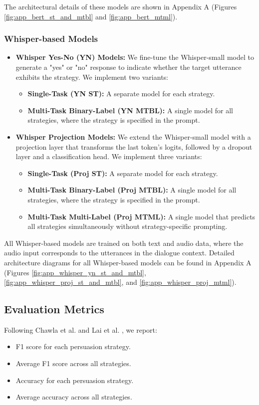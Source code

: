 \documentclass{article}
\begin{document}
The architectural details of these models are shown in Appendix A (Figures \ref{fig:app_bert_st_and_mtbl} and \ref{fig:app_bert_mtml}).

\subsubsection{Whisper-based Models}
\begin{itemize}
    \item \textbf{Whisper Yes-No (YN) Models:} We fine-tune the Whisper-small model to generate a "yes" or "no" response to indicate whether the target utterance exhibits the strategy. We implement two variants:
    \begin{itemize}
        \item \textbf{Single-Task (YN ST):} A separate model for each strategy.
        \item \textbf{Multi-Task Binary-Label (YN MTBL):} A single model for all strategies, where the strategy is specified in the prompt.
    \end{itemize}
    
    \item \textbf{Whisper Projection Models:} We extend the Whisper-small model with a projection layer that transforms the last token's logits, followed by a dropout layer and a classification head. We implement three variants:
    \begin{itemize}
        \item \textbf{Single-Task (Proj ST):} A separate model for each strategy.
        \item \textbf{Multi-Task Binary-Label (Proj MTBL):} A single model for all strategies, where the strategy is specified in the prompt.
        \item \textbf{Multi-Task Multi-Label (Proj MTML):} A single model that predicts all strategies simultaneously without strategy-specific prompting.
    \end{itemize}
\end{itemize}

All Whisper-based models are trained on both text and audio data, where the audio input corresponds to the utterances in the dialogue context. Detailed architecture diagrams for all Whisper-based models can be found in Appendix A (Figures \ref{fig:app_whisper_yn_st_and_mtbl}, \ref{fig:app_whisper_proj_st_and_mtbl}, and \ref{fig:app_whisper_proj_mtml}).

\subsection{Evaluation Metrics}
Following Chawla et al. \cite{chawla2021casino} and Lai et al. \cite{lai2022werewolf}, we report:
\begin{itemize}
    \item F1 score for each persuasion strategy.
    \item Average F1 score across all strategies.
    \item Accuracy for each persuasion strategy.
    \item Average accuracy across all strategies.
\end{itemize}
\end{document}
